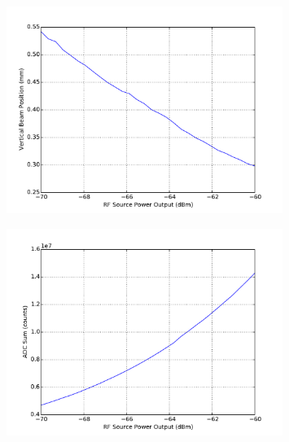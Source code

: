 \documentclass[a4paper, 11pt]{article}%
\begin{document}
%


\begin{figure}[htbp]%
\centering%
\includegraphics[width=0.8\textwidth]{./Results/power_vs_Y.pdf}%
\caption{}%
\end{figure}

%


\begin{figure}[htbp]%
\centering%
\includegraphics[width=0.8\textwidth]{./Results/power_vs_ADC_sum.pdf}%
\caption{}%
\end{figure}

%
\clearpage%
\end{document}
